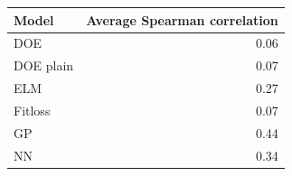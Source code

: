 \begin{tabular}{lr}
\toprule
Model & Average Spearman correlation \\
\midrule
DOE & 0.06 \\
DOE plain & 0.07 \\
ELM & 0.27 \\
Fitloss & 0.07 \\
GP & 0.44 \\
NN & 0.34 \\
\bottomrule
\end{tabular}
